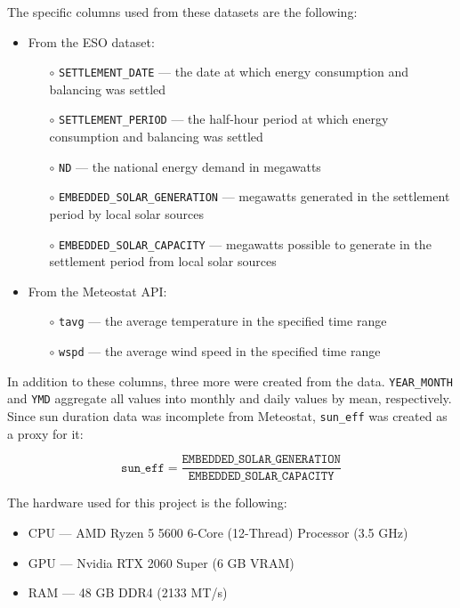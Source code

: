 \documentclass[12pt]{scrreprt}
\begin{document}
The specific columns used from these datasets are the following:
\begin{itemize}
    \item From the ESO dataset:
    \begin{itemize}
        \item[$\circ$] \texttt{SETTLEMENT\_DATE} --- the date at which energy consumption and balancing was settled
        \item[$\circ$] \texttt{SETTLEMENT\_PERIOD} --- the half-hour period at which energy consumption and balancing was settled
        \item[$\circ$] \texttt{ND} --- the national energy demand in megawatts
        \item[$\circ$] \texttt{EMBEDDED\_SOLAR\_GENERATION} --- megawatts generated in the settlement period by local solar sources
        \item[$\circ$] \texttt{EMBEDDED\_SOLAR\_CAPACITY} --- megawatts possible to generate in the settlement period from local solar sources
    \end{itemize}
    \item From the Meteostat API:
    \begin{itemize}
        \item[$\circ$] \texttt{tavg} --- the average temperature in the specified time range
        \item[$\circ$] \texttt{wspd} --- the average wind speed in the specified time range
    \end{itemize}
\end{itemize}

In addition to these columns, three more were created from the data. \texttt{YEAR\_MONTH} and \texttt{YMD} aggregate all values into monthly and daily values by mean, respectively. Since sun duration data was incomplete from Meteostat, \texttt{sun\_eff} was created as a proxy for it:

\[\texttt{sun\_eff}=\frac{\texttt{EMBEDDED\_SOLAR\_GENERATION}}{\texttt{EMBEDDED\_SOLAR\_CAPACITY}}\]

\newpage
The hardware used for this project is the following:
\begin{itemize}
    \item CPU --- AMD Ryzen 5 5600 6-Core (12-Thread) Processor (3.5 GHz)
    \item GPU --- Nvidia RTX 2060 Super (6 GB VRAM)
    \item RAM --- 48 GB DDR4 (2133 MT/s)
\end{itemize}
\end{document}
